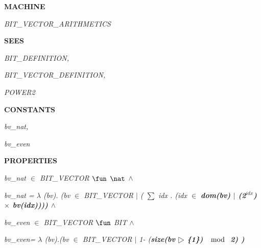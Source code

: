 

\bf MACHINE

\hspace*{0.20in}\it BIT\_VECTOR\_ARITHMETICS

\hspace*{0.20in}

\bf SEES 

\hspace*{0.20in}\it BIT\_DEFINITION\rm ,

\hspace*{0.20in}\it BIT\_VECTOR\_DEFINITION\rm ,

\hspace*{0.20in}\it POWER2

\hspace*{0.20in}

\hspace*{0.20in}

\hspace*{0.20in}

\bf CONSTANTS

\hspace*{0.20in}\it bv\_nat\rm ,

\hspace*{0.20in}\it bv\_even

\hspace*{0.20in}

\bf PROPERTIES

\hspace*{0.20in}\it bv\_nat  $\in$  \it BIT\_VECTOR  $\fun$   $\nat$   $\land$ 

\hspace*{0.20in}\it bv\_nat \rm =  $\lambda$  \rm (\it bv\rm )\rm . \rm (\it bv  $\in$  \it BIT\_VECTOR  $\mid$  \rm (  $\sum$  \it idx \rm . \rm (\it idx  $\in$  \bf dom\rm (\it bv\rm )  $\mid$  \rm (\rm 2$^{idx}$\rm )  $\times$  \it bv\rm (\it idx\rm )\rm )\rm )\rm ) $\land$ 

\vspace*{4mm}
\hspace*{0.20in}

\hspace*{0.20in}\it bv\_even $\in$ \it BIT\_VECTOR  $\fun$  \it BIT  $\land$ 

\hspace*{0.20in}\it bv\_even\rm = $\lambda$ \rm (\it bv\rm )\rm .\rm (\it bv $\in$ \it BIT\_VECTOR $\mid$  \rm 1\rm - \rm (\bf size\rm (\it bv $\rres$ \rm \{\rm 1\rm \}\rm )  $\mod$  \rm 2\rm ) \rm )

\hspace*{0.20in}


